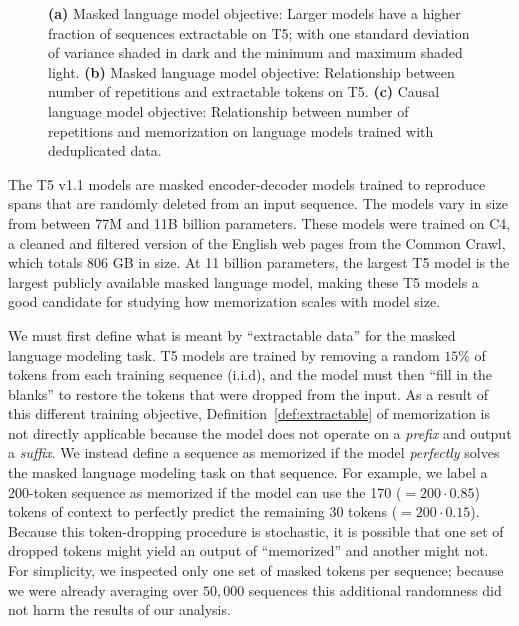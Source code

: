 \begin{figure}[t]
    \vskip-5pt
    \caption{
    \textbf{(a)}
    Masked language model objective: Larger models have a higher fraction of sequences extractable on T5;
    with one standard deviation of variance shaded in dark and the minimum and maximum shaded light.
    \textbf{(b)}
    Masked language model objective: Relationship between number of repetitions and extractable tokens on T5.
    \textbf{(c)}
    Causal language model objective: Relationship between number of repetitions and memorization on language models trained with deduplicated data.
    }
    \label{fig:other-models}
\end{figure}

The T5 v1.1 models are masked encoder-decoder models trained to reproduce spans that are randomly deleted from an input sequence. The models vary in size from between 77M and 11B billion parameters.
%
These models were trained on C4, a cleaned and filtered version of the English web pages from the Common Crawl, which totals 806 GB in size.
%
At 11 billion parameters, the largest T5 model is the largest publicly available masked language model, making these T5 models a good candidate for studying how memorization scales with model size.

We must first define what is meant by ``extractable data''
for the masked language modeling task.
T5 models are trained by removing a random $15\%$ of tokens from each training sequence (i.i.d), and the model must then
``fill in the blanks'' to restore the tokens that were dropped from the input.
%
%
As a result of this different training objective,
Definition~\ref{def:extractable} of memorization is not directly applicable because the model does not operate on a \emph{prefix} and output a \emph{suffix}.
We instead define a sequence as memorized if the model \emph{perfectly} solves the masked language modeling task on that sequence.
%
For example, we label a 200-token sequence as memorized if the model can
use the 170 ($=200 \cdot 0.85$) tokens of context to perfectly predict the remaining 30 tokens ($=200 \cdot 0.15$).
%
Because this token-dropping procedure is stochastic, it is possible that one set of dropped tokens might yield
an output of ``memorized'' and another might not.
%
For simplicity, we inspected only one set of masked tokens per sequence; because we were already averaging over
$50,000$ sequences this additional randomness did not harm the results of our analysis.

